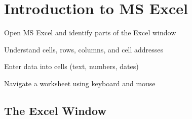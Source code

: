 \chapter{Introduction to MS Excel}
\label{ch:excel-intro}

\begin{objectives}
  \item Open MS Excel and identify parts of the Excel window
  \item Understand cells, rows, columns, and cell addresses
  \item Enter data into cells (text, numbers, dates)
  \item Navigate a worksheet using keyboard and mouse
\end{objectives}


\section{The Excel Window}
\label{sec:excel-window}

